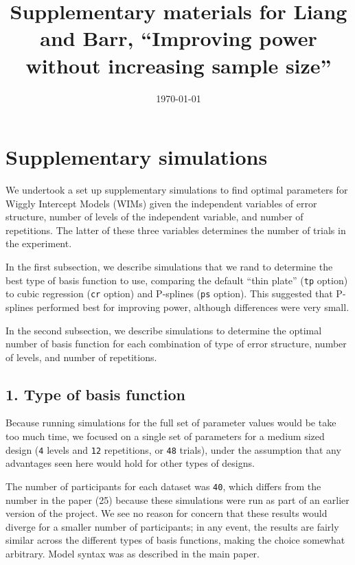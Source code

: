 \documentclass[doc]{apa7}
\date{\today}
\title{Supplementary materials for Liang and Barr, ``Improving power without increasing sample size''}
\begin{document}
\maketitle

\section*{Supplementary simulations}
\label{sec:orgd7f958c}

\setlength{\parindent}{0cm}

We undertook a set up supplementary simulations to find optimal parameters for Wiggly Intercept Models (WIMs) given the independent variables of error structure, number of levels of the independent variable, and number of repetitions. The latter of these three variables determines the number of trials in the experiment.

In the first subsection, we describe simulations that we rand to determine the best type of basis function to use, comparing the default ``thin plate'' (\texttt{tp} option) to cubic regression (\texttt{cr} option) and P-splines (\texttt{ps} option). This suggested that P-splines performed best for improving power, although differences were very small.

In the second subsection, we describe simulations to determine the optimal number of basis function for each combination of type of error structure, number of levels, and number of repetitions.

\subsection*{1. Type of basis function}
\label{sec:orgff789e3}

Because running simulations for the full set of parameter values would be take too much time, we focused on a single set of parameters for a medium sized design (\texttt{4} levels and \texttt{12} repetitions, or \texttt{48} trials), under the assumption that any advantages seen here would hold for other types of designs.

The number of participants for each dataset was \texttt{40}, which differs from the number in the paper (25) because these simulations were run as part of an earlier version of the project. We see no reason for concern that these results would diverge for a smaller number of participants; in any event, the results are fairly similar across the different types of basis functions, making the choice somewhat arbitrary. Model syntax was as described in the main paper. 
\end{document}
